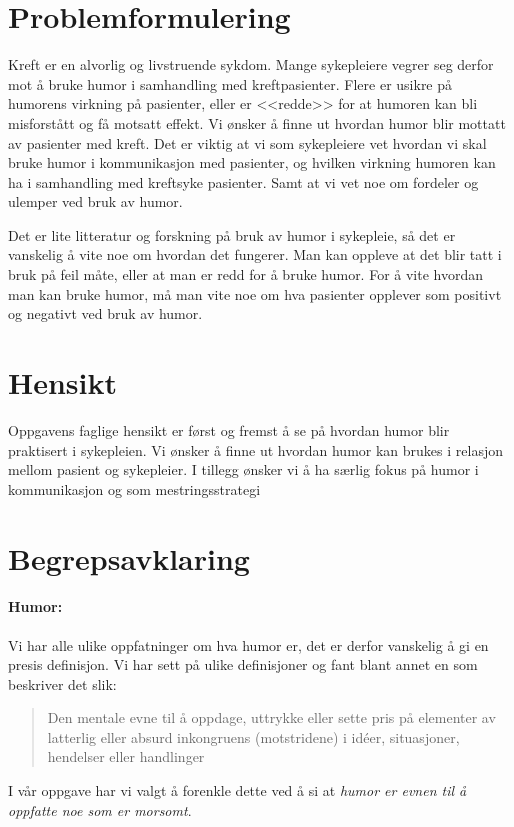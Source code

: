 \section{Problemformulering}

Kreft er en alvorlig og livstruende sykdom. Mange sykepleiere vegrer seg derfor
mot å bruke humor i samhandling med kreftpasienter. Flere er usikre på humorens
virkning på pasienter, eller er <<redde>> for at humoren kan bli misforstått og
få motsatt effekt. Vi ønsker å finne ut hvordan humor blir mottatt av pasienter
med kreft. Det er viktig at vi som sykepleiere vet hvordan vi skal bruke humor
i kommunikasjon med pasienter, og hvilken virkning humoren kan ha i samhandling
med kreftsyke pasienter. Samt at vi vet noe om fordeler og ulemper ved bruk av
humor.

Det er lite litteratur og forskning på bruk av humor i sykepleie, så det er
vanskelig å vite noe om hvordan det fungerer. Man kan oppleve at det blir tatt
i bruk på feil måte, eller at man er redd for å bruke humor. For å vite hvordan
man kan bruke humor, må man vite noe om hva pasienter opplever som positivt og
negativt ved bruk av humor.

\section{Hensikt}

Oppgavens faglige hensikt er først og fremst å se på hvordan humor blir
praktisert i sykepleien. Vi ønsker å finne ut hvordan humor kan brukes i
relasjon mellom pasient og sykepleier. I tillegg ønsker vi å ha særlig fokus på
humor i kommunikasjon og som mestringsstrategi

\section{Begrepsavklaring}

\paragraph{Humor:} Vi har alle ulike oppfatninger om hva humor er, det er
derfor vanskelig å gi en presis definisjon. Vi har sett på ulike definisjoner
og fant blant annet en som beskriver det slik:
\blockquote[{}]{Den mentale evne til å oppdage,
uttrykke eller sette pris på elementer av latterlig eller absurd inkongruens
(motstridene) i idéer, situasjoner, hendelser eller handlinger}.  I vår oppgave
har vi valgt å forenkle dette ved å si at \textit{humor er evnen til å oppfatte
noe som er morsomt}.

